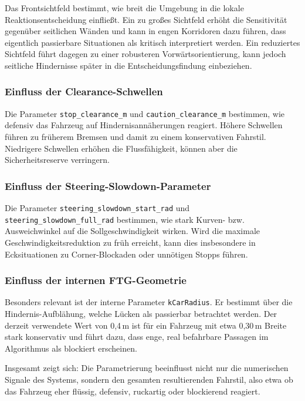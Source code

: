 Das Frontsichtfeld bestimmt, wie breit die Umgebung in die lokale Reaktionsentscheidung einfließt. Ein zu großes Sichtfeld erhöht die Sensitivität gegenüber seitlichen Wänden und kann in engen Korridoren dazu führen, dass eigentlich passierbare Situationen als kritisch interpretiert werden. Ein reduziertes Sichtfeld führt dagegen zu einer robusteren Vorwärtsorientierung, kann jedoch seitliche Hindernisse später in die Entscheidungsfindung einbeziehen.

\subsubsection*{Einfluss der Clearance-Schwellen}

Die Parameter \texttt{stop\_clearance\_m} und \texttt{caution\_clearance\_m} bestimmen, wie defensiv das Fahrzeug auf Hindernisannäherungen reagiert. Höhere Schwellen führen zu früherem Bremsen und damit zu einem konservativen Fahrstil. Niedrigere Schwellen erhöhen die Flussfähigkeit, können aber die Sicherheitsreserve verringern.

\subsubsection*{Einfluss der Steering-Slowdown-Parameter}

Die Parameter \texttt{steering\_slowdown\_start\_rad} und \texttt{steering\_slowdown\_full\_rad} bestimmen, wie stark Kurven- bzw. Ausweichwinkel auf die Sollgeschwindigkeit wirken. Wird die maximale Geschwindigkeitsreduktion zu früh erreicht, kann dies insbesondere in Ecksituationen zu Corner-Blockaden oder unnötigen Stopps führen.

\subsubsection*{Einfluss der internen FTG-Geometrie}

Besonders relevant ist der interne Parameter \texttt{kCarRadius}. Er bestimmt über die Hindernis-Aufblähung, welche Lücken als passierbar betrachtet werden. Der derzeit verwendete Wert von 0{,}4\,m ist für ein Fahrzeug mit etwa 0{,}30\,m Breite stark konservativ und führt dazu, dass enge, real befahrbare Passagen im Algorithmus als blockiert erscheinen.

Insgesamt zeigt sich: Die Parametrierung beeinflusst nicht nur die numerischen Signale des Systems, sondern den gesamten resultierenden Fahrstil, also etwa ob das Fahrzeug eher flüssig, defensiv, ruckartig oder blockierend reagiert.

